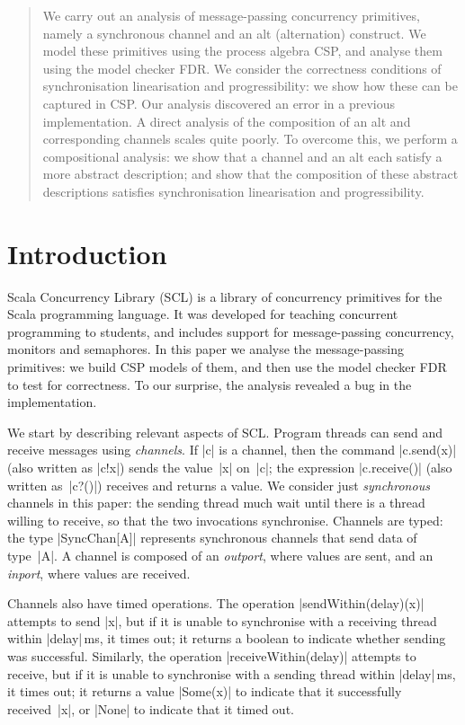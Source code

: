 \begin{abstract}
We carry out an analysis of message-passing concurrency primitives, namely a
synchronous channel and an alt (alternation) construct.  We model these
primitives using the process algebra CSP, and analyse them using the model
checker FDR.  We consider the correctness conditions of synchronisation
linearisation and progressibility: we show how these can be captured in CSP\@.
Our analysis discovered an error in a previous implementation.  A direct
analysis of the composition of an alt and corresponding channels scales quite
poorly.  To overcome this, we perform a compositional analysis: we show that a
channel and an alt each satisfy a more abstract description; and show that the
composition of these abstract descriptions satisfies synchronisation
linearisation and progressibility.
\end{abstract}


\section{Introduction}

Scala Concurrency Library (SCL) is a library of concurrency primitives for the
Scala programming language.  It was developed for teaching concurrent
programming to students, and includes support for message-passing concurrency,
monitors and semaphores.  In this paper we analyse the message-passing
primitives: we build CSP models of them, and then use the model checker FDR to
test for correctness.  To our surprise, the analysis revealed a bug in the
implementation.

We start by describing relevant aspects of SCL\@.  Program threads can send
and receive messages using \emph{channels}.  If |c| is a channel, then the
command |c.send(x)| (also written as |c!x|) sends the value~|x| on~|c|; the
expression |c.receive()| (also written as~|c?()|) receives and
returns a value.  We consider just \emph{synchronous} channels in this paper:
the sending thread much wait until there is a thread willing to receive, so
that the two invocations synchronise.  Channels are typed: the type
|SyncChan[A]| represents synchronous channels that send data of type~|A|.  A
channel is composed of an \emph{outport}, where values are sent, and an
\emph{inport}, where values are received.

Channels also have timed operations.  The operation |sendWithin(delay)(x)|
attempts to send |x|, but if it is unable to synchronise with a receiving
thread within |delay|\,ms, it times out; it returns a boolean to indicate
whether sending was successful.  Similarly, the operation
|receiveWithin(delay)| attempts to receive, but if it is unable to synchronise
with a sending thread within |delay|\,ms, it times out; it returns a value
|Some(x)| to indicate that it successfully received~|x|, or |None| to indicate
that it timed out.

